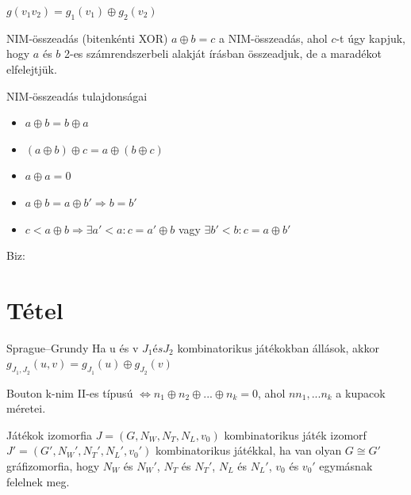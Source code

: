 		
\begin{theorem}{}{}
    $g(v_1v_2) = g_1(v_1)\oplus g_2(v_2)$
\end{theorem}

\begin{definition}{NIM-összeadás (bitenkénti XOR)}{}
    $a \oplus b = c$ a NIM-összeadás, ahol $c$-t úgy kapjuk, hogy $a$ és $b$ 2-es számrendszerbeli alakját írásban összeadjuk, de a maradékot elfelejtjük. 
\end{definition}

\begin{observation}{NIM-összeadás tulajdonságai}{}
    \begin{itemize}
        \item $a\oplus b = b\oplus a$
        \item $(a \oplus b ) \oplus c = a \oplus (b \oplus c)$
        \item $a \oplus a = 0$
        \item $a \oplus b = a \oplus b'\Rightarrow b=b'$
        \item $c < a \oplus b \Rightarrow \exists a' < a: c =a' \oplus b$ vagy $\exists b' < b: c =a \oplus b'$
    \end{itemize}
\end{observation}
Biz: \\

\newpage
\section{Tétel}
\begin{theorem}{Sprague–Grundy}{}
	 Ha u és v $J_1 és J_2$ kombinatorikus játékokban állások, akkor $g_{J_1,J_2}(u, v) = g_{J_1}(u) \oplus g_{J_2}(v)$
\end{theorem}

\begin{theorem}{Bouton}{}
	k-nim II-es típusú $\Leftrightarrow n_1 \oplus n_2 \oplus ... \oplus n_k = 0$, ahol $nn_1, ... n_k$ a kupacok méretei.
\end{theorem}

\begin{definition}{Játékok izomorfia}{}
	$J = (G, N_W, N_T, N_L, v_0)$ kombinatorikus játék izomorf $J' = (G', N_W', N_T', N_L', v_0')$ kombinatorikus játékkal, ha van olyan $G \cong G'$ gráfizomorfia, hogy $N_W$ és $N_W'$, $N_T$ és $N_T'$, $N_L$ és $N_L'$, $v_0$ és $v_0'$ egymásnak felelnek meg.
\end{definition}

